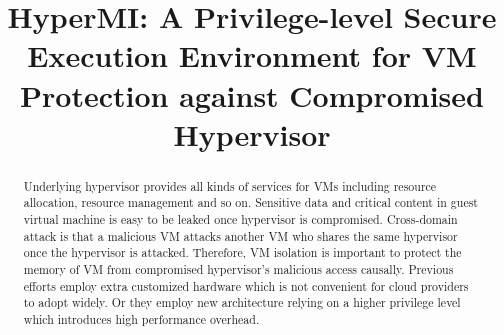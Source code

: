 \documentclass[conference]{IEEEtran}
\begin{document}
\title{HyperMI: A Privilege-level Secure Execution Environment for VM Protection against Compromised Hypervisor}
\author{
\IEEEauthorblockA{\textit{Institute of Information Engineering, Chinese Academy of Sciences} \\
\textit{School of Cyber Security, University of Chinese Academy of Sciences}\\
\{liuwenqing,linkunli,zhangkun,tubibo\}@iie.ac.cn}


}

\maketitle

\begin{abstract}

\iffalse
Underlying hypervisor provides all kinds of services for VMs including resource allocation, resource management and so on. Sensitive data and critical content in guest virtual machine is easy to be leaked once hypervisor is compromised. 
Cross-domain attack is that a malicious VM attacks another VM who shares the same hypervisor once the hypervisor is attacked. Therefore, VM isolation is important to protect the memory of VM from compromised hypervisor's malicious access causally. Previous efforts employ extra customized hardware which is not convenient for cloud providers to adopt widely. Or they employ new architecture relying on a higher privilege level which introduces high performance overhead.


\end{abstract}
\end{document}
